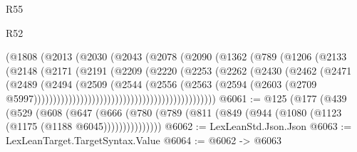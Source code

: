 \begin{lexlean}{R55}
\begin{lexlean}{R52}
\begin{coremodule}
{{{{{{{{{{{{{{{{{{{{{{{{{{{{{{{{{{{{{{{{{{{{{{{{{{{{{{{{{{{{{{{{{{{{{{{{{{{{{{{{{{{{{{{{{{{{{{{{{{{{{{{{{{{{{{{{{{{{{{{{{{{{{{{{{{{{{{{{{{{{{{{{{{{{{{{{{{{{{{{{{{{{{{{{{{{{{{{{{{{{{{{{{{{{{{{{{{{{{{                                        (@1808
                                          (@2013
                                            (@2030
                                              (@2043
                                                (@2078
                                                  (@2090
                                                    (@1362
                                                      (@789
                                                        (@1206
                                                          (@2133
                                                            (@2148
                                                              (@2171
                                                                (@2191
                                                                  (@2209
                                                                    (@2220
                                                                      (@2253
                                                                        (@2262
                                                                          (@2430
                                                                            (@2462
                                                                              (@2471
                                                                                (@2489
                                                                                  (@2494
                                                                                    (@2509
                                                                                      (@2544
                                                                                        (@2556
                                                                                          (@2563
                                                                                            (@2594
                                                                                              (@2603
                                                                                                (@2709
                                                                                                  @5997)))))))))))))))))))))))))))))))))))))))))))))))
@6061 := @125
    (@177
      (@439
        (@529
          (@608
            (@647
              (@666 (@780 (@789 (@811 (@849 (@944 (@1080 (@1123 (@1175 (@1188 @6045)))))))))))))))
@6062 := LexLeanStd.Json.Json
@6063 := LexLeanTarget.TargetSyntax.Value
@6064 := @6062 -> @6063
}}}}}}}}}}}}}}}}}}}}}}}}}}}}}}}}}}}}}}}}}}}}}}}}}}}}}}}}}}}}}}}}}}}}}}}}}}}}}}}}}}}}}}}}}}}}}}}}}}}}}}}}}}}}}}}}}}}}}}}}}}}}}}}}}}}}}}}}}}}}}}}}}}}}}}}}}}}}}}}}}}}}}}}}}}}}}}}}}}}}}}}}}}}}}}}}}}}}}}
\end{coremodule}
\end{lexlean}
\end{lexlean}
